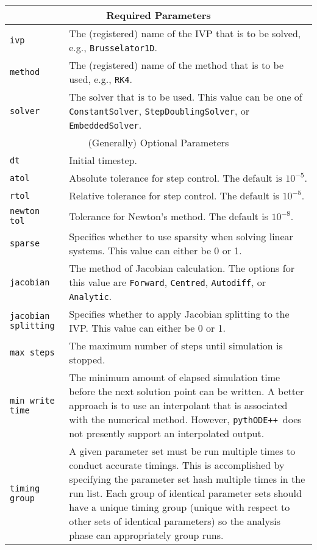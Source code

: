 \documentclass[11pt]{article}
\newcommand{\pypp}{\texttt{pythODE++}}
\begin{document}
\begin{center}
\begin{tabular}{|p{.25\linewidth}|p{.65\linewidth}|}
\hline
\multicolumn{2}{|c|}{Required Parameters} \\
\hline \hline
\verb=ivp= & The (registered) name of the IVP that is to be solved, e.g., \verb=Brusselator1D=.\\\hline
\verb=method= & The (registered) name of the method that is to be used, e.g., \verb=RK4=. \\\hline
\verb=solver= & The solver that is to be used. This value can be one of \verb=ConstantSolver=, \verb=StepDoublingSolver=, or \verb=EmbeddedSolver=. \\\hline
\hline
\multicolumn{2}{|c|}{(Generally) Optional Parameters} \\
\hline \hline
\verb=dt= & Initial timestep. \\\hline
\verb=atol= & Absolute tolerance for step control. The default is $10^{-5}$.\\\hline
\verb=rtol= & Relative tolerance for step control. The default is $10^{-5}$.\\\hline
\verb=newton tol= & Tolerance for Newton's method. The default is $10^{-8}$.\\\hline
\verb=sparse= & Specifies whether to use sparsity when solving linear systems. This value can either be 0 or 1. \\\hline
\verb=jacobian= & The method of Jacobian calculation. The options for this value are \verb=Forward=, \verb=Centred=, \verb=Autodiff=, or \verb=Analytic=. \\\hline
\verb=jacobian splitting= & Specifies whether to apply Jacobian splitting to the IVP. This value can either be 0 or 1. \\\hline
\verb=max steps= & The maximum number of steps until simulation is stopped. \\\hline
\verb=min write time=& The minimum amount of elapsed simulation time before the next solution point can be written. A better approach is to use an interpolant that is associated with the numerical method. However, \pypp\ does not presently support an interpolated output. \\\hline
\verb=timing group=& A given parameter set must be run multiple times to conduct accurate timings. This is accomplished by specifying the parameter set hash multiple times in the run list. Each group of identical parameter sets should have a unique timing group (unique with respect to other sets of identical parameters) so the analysis phase can appropriately group runs. \\\hline
\end{tabular}
\end{center}
\end{document}
